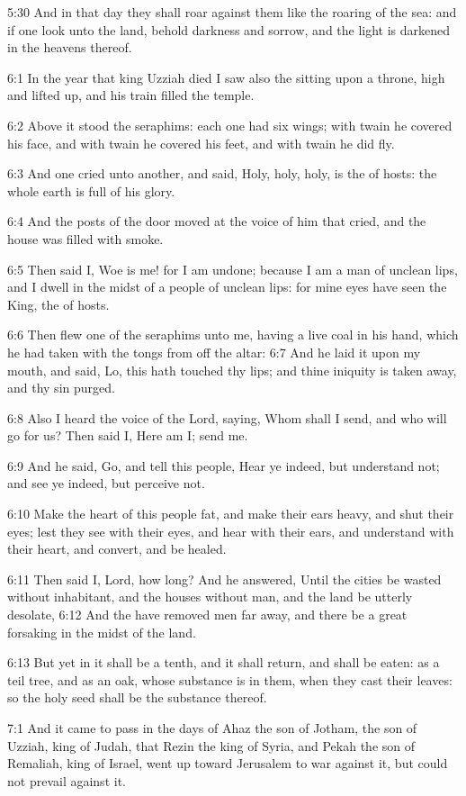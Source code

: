 5:30 And in that day they shall roar against them like the roaring of
the sea: and if one look unto the land, behold darkness and sorrow,
and the light is darkened in the heavens thereof.

6:1 In the year that king Uzziah died I saw also the \LORD sitting upon
a throne, high and lifted up, and his train filled the temple.

6:2 Above it stood the seraphims: each one had six wings; with twain
he covered his face, and with twain he covered his feet, and with
twain he did fly.

6:3 And one cried unto another, and said, Holy, holy, holy, is the
\LORD of hosts: the whole earth is full of his glory.

6:4 And the posts of the door moved at the voice of him that cried,
and the house was filled with smoke.

6:5 Then said I, Woe is me! for I am undone; because I am a man of
unclean lips, and I dwell in the midst of a people of unclean lips:
for mine eyes have seen the King, the \LORD of hosts.

6:6 Then flew one of the seraphims unto me, having a live coal in his
hand, which he had taken with the tongs from off the altar: 6:7 And he
laid it upon my mouth, and said, Lo, this hath touched thy lips; and
thine iniquity is taken away, and thy sin purged.

6:8 Also I heard the voice of the Lord, saying, Whom shall I send, and
who will go for us? Then said I, Here am I; send me.

6:9 And he said, Go, and tell this people, Hear ye indeed, but
understand not; and see ye indeed, but perceive not.

6:10 Make the heart of this people fat, and make their ears heavy, and
shut their eyes; lest they see with their eyes, and hear with their
ears, and understand with their heart, and convert, and be healed.

6:11 Then said I, Lord, how long? And he answered, Until the cities be
wasted without inhabitant, and the houses without man, and the land be
utterly desolate, 6:12 And the \LORD have removed men far away, and
there be a great forsaking in the midst of the land.

6:13 But yet in it shall be a tenth, and it shall return, and shall be
eaten: as a teil tree, and as an oak, whose substance is in them, when
they cast their leaves: so the holy seed shall be the substance
thereof.

7:1 And it came to pass in the days of Ahaz the son of Jotham, the son
of Uzziah, king of Judah, that Rezin the king of Syria, and Pekah the
son of Remaliah, king of Israel, went up toward Jerusalem to war
against it, but could not prevail against it.

